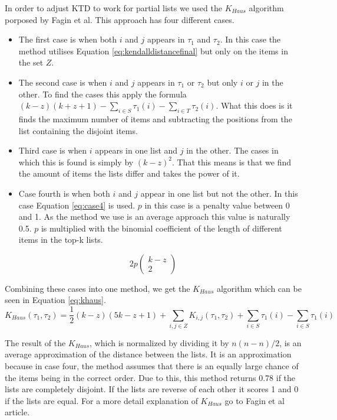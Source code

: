 In order to adjust KTD to work for partial lists we used the $K_{Haus}$ algorithm porposed by Fagin et al\cite{comparing:topk}. This approach has four different cases. 
\begin{itemize}
\item The first case is when both $i$ and $j$ appears in $\tau_1$ and $\tau_2$. In this case the method utilises Equation \ref{eq:kendalldistancefinal} but only on the items in the set $Z$.

\item The second case is when $i$ and $j$ appears in $\tau_1$ or $\tau_2$ but only $i$ or $j$ in the other. To find the cases this apply the formula $(k-z)(k+z+1)- \sum_{i \in S} \tau_1(i)- \sum_{i \in T} \tau_2(i)$. What this does is it finds the maximum number of items and subtracting the positions from the list containing the disjoint items.


\item Third case is when $i$ appears in one list and $j$ in the other. The cases in which this is found is simply by $(k-z)^2$. That this means is that we find the amount of items the lists differ and takes the power of it.  

\item Case fourth is when both $i$ and $j$ appear in one list but not the other. In this case Equation \ref{eq:case4} is used. $p$ in this case is a penalty value between 0 and 1. As the method we use is an average approach this value is naturally 0.5. $p$ is multiplied with the binomial coefficient of the length of different items in the top-k lists.

\end{itemize}
\begin{equation}\label{eq:case4}
2p\left(\!
    \begin{array}{c}
      k-z \\
      2
    \end{array}
  \!\right)
\end{equation}


Combining these cases into one method, we get the $K_{Haus}$ algorithm which can be seen in Equation \ref{eq:khaus}. 
\footnotesize
\begin{equation}\label{eq:khaus}
K_{Haus}(\tau_1,\tau_2) = \frac{1}{2}(k-z)(5k-z+1)+ \sum_{i,j \in Z} K_{i,j}(\tau_1,\tau_2) + \sum_{i \in S}\tau_1(i) - \sum_{i \in S}\tau_1(i)
\end{equation}
\normalsize

The result of the $K_{Haus}$, which is normalized by dividing it by $n(n-n)/2$, is an average approximation of the distance between the lists. It is an approximation because in case four, the method assumes that there is an equally large chance of the items being in the correct order. Due to this, this method returns 0.78 if the lists are completely disjoint. If the lists are reverse of each other it scores 1 and 0 if the lists are equal. For a more detail explanation of $K_{Haus}$ go to Fagin et al\cite{comparing:topk} article.

